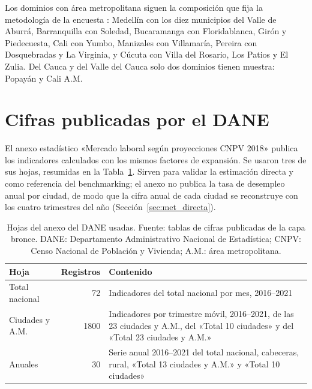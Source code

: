 Los dominios con área metropolitana siguen la composición que fija la metodología de la encuesta \cite[p.~9]{DANE_GEIH_Metodologia2016}: Medellín con los diez municipios del Valle de Aburrá, Barranquilla con Soledad, Bucaramanga con Floridablanca, Girón y Piedecuesta, Cali con Yumbo, Manizales con Villamaría, Pereira con Dosquebradas y La Virginia, y Cúcuta con Villa del Rosario, Los Patios y El Zulia. Del Cauca y del Valle del Cauca solo dos dominios tienen muestra: Popayán y Cali A.M.

\section{Cifras publicadas por el DANE}
\label{sec:datos_anexo}

El anexo estadístico «Mercado laboral según proyecciones CNPV 2018» \cite{DANE_Anexo_CNPV2018} publica los indicadores calculados con los mismos factores de expansión. Se usaron tres de sus hojas, resumidas en la Tabla~\ref{tab:anexo_dane}. Sirven para validar la estimación directa y como referencia del benchmarking; el anexo no publica la tasa de desempleo anual por ciudad, de modo que la cifra anual de cada ciudad se reconstruye con los cuatro trimestres del año (Sección~\ref{sec:met_directa}).

\begin{table}[!htbp]
\centering
\small
\caption[Hojas del anexo del DANE usadas]{Hojas del anexo del DANE usadas. Fuente: tablas de cifras publicadas de la capa bronce. DANE: Departamento Administrativo Nacional de Estadística; CNPV: Censo Nacional de Población y Vivienda; A.M.: área metropolitana.}
\label{tab:anexo_dane}
\renewcommand{\arraystretch}{1.15}
\begin{tabularx}{\linewidth}{>{\raggedright\arraybackslash}p{3.0cm} r >{\raggedright\arraybackslash}X}
\toprule
Hoja & Registros & Contenido \\
\midrule
Total nacional & 72 & Indicadores del total nacional por mes, 2016--2021 \\
Ciudades y A.M. & \num{1800} & Indicadores por trimestre móvil, 2016--2021, de las 23 ciudades y A.M., del «Total 10 ciudades» y del «Total 23 ciudades y A.M.» \\
Anuales & 30 & Serie anual 2016--2021 del total nacional, cabeceras, rural, «Total 13 ciudades y A.M.» y «Total 10 ciudades» \\
\bottomrule
\end{tabularx}
\end{table}

